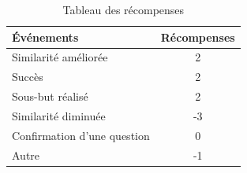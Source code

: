 \begin{table}[H]
	\begin{center}
		
		\begin{tabular}{|l|c|} %
			\hline
			\textbf{Événements} & \textbf{Récompenses}\\
			\hline
			Similarité améliorée & 2\\
			\hline
			Succès & 2\\
			\hline
			Sous-but réalisé & 2\\
			\hline
			Similarité diminuée & -3\\
			\hline
			Confirmation d'une question & 0\\
			\hline
			Autre & -1\\
			\hline
		\end{tabular}
		\caption{Tableau des récompenses}\label{table_reward}
	\end{center}
\end{table}

